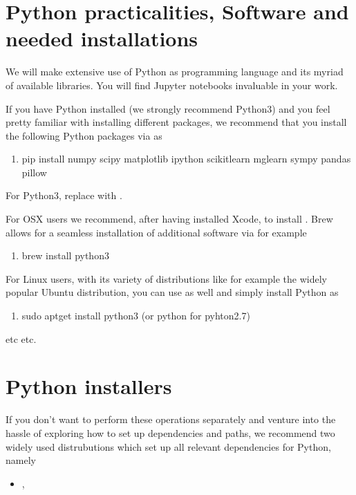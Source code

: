 \documentclass[letterpaper,10pt,english]{sphinxmanual}
\begin{document}
\section{Python practicalities, Software and needed installations}
\label{\detokenize{chapter1:python-practicalities-software-and-needed-installations}}
We will make extensive use of Python as programming language and its
myriad of available libraries.  You will find
Jupyter notebooks invaluable in your work.

If you have Python installed (we strongly recommend Python3) and you feel
pretty familiar with installing different packages, we recommend that
you install the following Python packages via  as
\begin{enumerate}
%
\item {} 
pip install numpy scipy matplotlib ipython scikit\sphinxhyphen{}learn mglearn sympy pandas pillow

\end{enumerate}

For Python3, replace  with .

For OSX users we recommend, after having installed Xcode, to
install . Brew allows for a seamless installation of additional
software via for example
\begin{enumerate}
%
\item {} 
brew install python3

\end{enumerate}

For Linux users, with its variety of distributions like for example the widely popular Ubuntu distribution,
you can use  as well and simply install Python as
\begin{enumerate}
%
\item {} 
sudo apt\sphinxhyphen{}get install python3  (or python for pyhton2.7)

\end{enumerate}

etc etc.


\section{Python installers}
\label{\detokenize{chapter1:python-installers}}
If you don’t want to perform these operations separately and venture
into the hassle of exploring how to set up dependencies and paths, we
recommend two widely used distrubutions which set up all relevant
dependencies for Python, namely
\begin{itemize}
\item {} 
,

\end{itemize}
\end{document}
